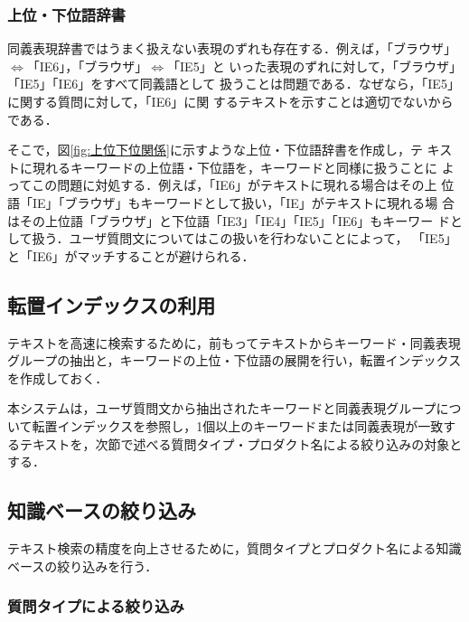 \subsubsection{上位・下位語辞書} \label{subsubsec:上位・下位語辞書}

同義表現辞書ではうまく扱えない表現のずれも存在する．例えば，「ブラウザ」
$\Longleftrightarrow$「IE6」，「ブラウザ」$\Longleftrightarrow$「IE5」と
いった表現のずれに対して，「ブラウザ」「IE5」「IE6」をすべて同義語として
扱うことは問題である．なぜなら，「IE5」に関する質問に対して，「IE6」に関
するテキストを示すことは適切でないからである．

そこで，図\ref{fig:上位下位関係}に示すような上位・下位語辞書を作成し，テ
キストに現れるキーワードの上位語・下位語を，キーワードと同様に扱うことに
よってこの問題に対処する．例えば，「IE6」がテキストに現れる場合はその上
位語「IE」「ブラウザ」もキーワードとして扱い，「IE」がテキストに現れる場
合はその上位語「ブラウザ」と下位語「IE3」「IE4」「IE5」「IE6」もキーワー
ドとして扱う．ユーザ質問文についてはこの扱いを行わないことによって，
「IE5」と「IE6」がマッチすることが避けられる．



\subsection{転置インデックスの利用} \label{subsec:転置インデックス}

テキストを高速に検索するために，前もってテキストからキーワード・同義表現
グループの抽出と，キーワードの上位・下位語の展開を行い，転置インデックス
を作成しておく．

本システムは，ユーザ質問文から抽出されたキーワードと同義表現グループにつ
いて転置インデックスを参照し，1個以上のキーワードまたは同義表現が一致す
るテキストを，次節で述べる質問タイプ・プロダクト名による絞り込みの対象と
する．



\subsection{知識ベースの絞り込み} \label{subsec:テキスト集合の絞り込み}

テキスト検索の精度を向上させるために，質問タイプとプロダクト名による知識
ベースの絞り込みを行う．

\subsubsection{質問タイプによる絞り込み} \label{subsubsec:質問タイプによる絞り込み}

